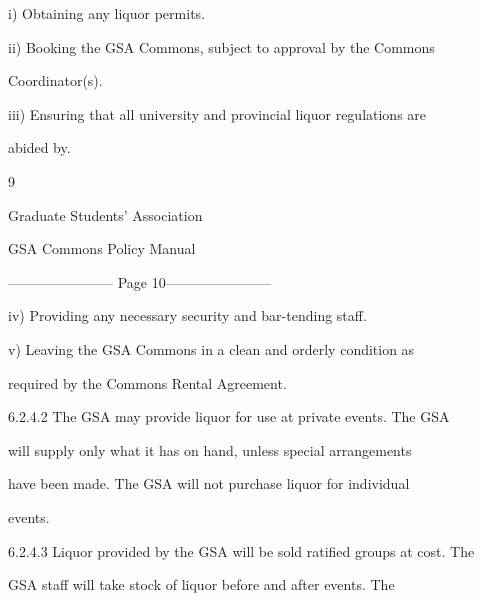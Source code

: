     i)       Obtaining any liquor permits.  



  



    ii)      Booking the GSA Commons, subject to approval by the Commons  

             Coordinator(s).  



  



    iii)     Ensuring  that  all  university  and  provincial  liquor  regulations  are  

             abided by.  



  



                                                     9  

                                    

                                  Graduate Students’ Association  

                                  GSA Commons Policy Manual  

  


----------------------- Page 10-----------------------

    iv)       Providing any necessary security and bar-tending staff.  



  



    v)        Leaving  the  GSA  Commons  in  a  clean  and  orderly  condition  as  

              required by the Commons Rental Agreement.  



  



6.2.4.2   The  GSA  may  provide  liquor  for  use  at  private  events.  The  GSA  

            will supply only what it  has  on hand,  unless special  arrangements  

            have been made. The GSA will not purchase liquor  for individual  

            events.   



6.2.4.3   Liquor provided by the GSA will be sold ratified groups at cost. The  

            GSA  staff  will  take  stock  of  liquor  before  and  after  events.  The  

